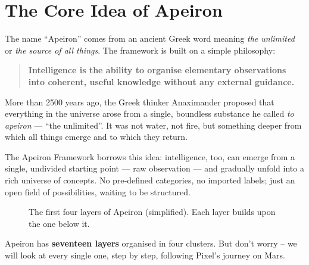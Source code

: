\section{The Core Idea of Apeiron}
\label{sec:idea}

The name “Apeiron” comes from an ancient Greek word meaning
\emph{the unlimited} or \emph{the source of all things}.  The framework
is built on a simple philosophy:
\begin{quote}
\textbf{Intelligence is the ability to organise elementary observations
into coherent, useful knowledge without any external guidance.}
\end{quote}

\begin{tcolorbox}[colback=purple!5, colframe=purple!50, title=\textbf{Where does the name come from?}]
More than 2500 years ago, the Greek thinker Anaximander proposed that
everything in the universe arose from a single, boundless substance he
called \emph{to apeiron} — “the unlimited”.  It was not water, not
fire, but something deeper from which all things emerge and to which
they return.

The Apeiron Framework borrows this idea: intelligence, too, can emerge
from a single, undivided starting point — raw observation — and
gradually unfold into a rich universe of concepts.  No pre‑defined
categories, no imported labels; just an open field of possibilities,
waiting to be structured.
\end{tcolorbox}

\begin{figure}[ht]
\centering
{}
\caption{The first four layers of Apeiron (simplified).  Each layer builds upon the one below it.}
\label{fig:layers_simple}
\end{figure}

Apeiron has \textbf{seventeen layers} organised in four clusters.
But don’t worry – we will look at every single one, step by step,
following Pixel’s journey on Mars.
